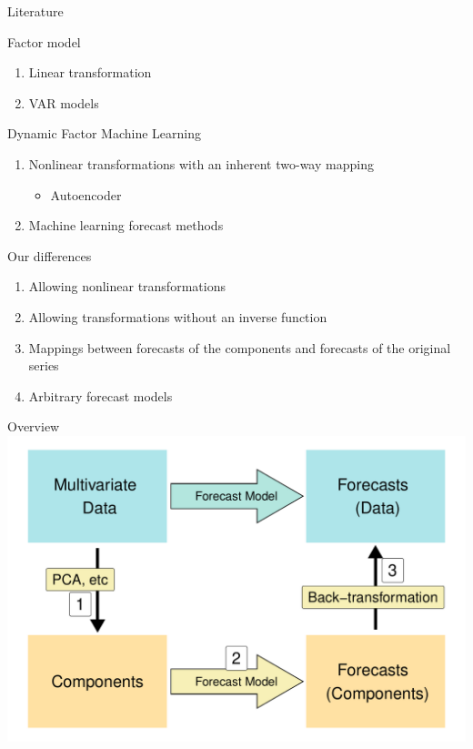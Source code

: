 \documentclass[14pt,ignorenonframetext,]{beamer}
\providecommand{\tightlist}{%
  \setlength{\itemsep}{0pt}\setlength{\parskip}{0pt}}
\begin{document}
\begin{frame}{Literature}
\protect\hypertarget{literature}{}
\begin{block}{Factor model \citep{Bai2008-of}}
\protect\hypertarget{factor-model-bai2008-of}{}
\begin{enumerate}
\tightlist
\item
  Linear transformation
\item
  VAR models
\end{enumerate}
\end{block}

\begin{block}{Dynamic Factor Machine Learning
\citep[DFML,][]{DeStefani2021-nt}}
\protect\hypertarget{dynamic-factor-machine-learning-dfml-destefani2021-nt}{}
\begin{enumerate}
\tightlist
\item
  Nonlinear transformations with an inherent two-way mapping

  \begin{itemize}
  \tightlist
  \item
    Autoencoder
  \end{itemize}
\item
  Machine learning forecast methods
\end{enumerate}
\end{block}
\end{frame}

\begin{frame}{Our differences}
\protect\hypertarget{our-differences}{}
\begin{enumerate}
\tightlist
\item
  Allowing nonlinear transformations
\item
  Allowing transformations without an inverse function
\item
  Mappings between forecasts of the components and forecasts of the
  original series
\item
  Arbitrary forecast models
\end{enumerate}
\end{frame}

\begin{frame}{Overview}
\protect\hypertarget{overview}{}
\includegraphics[width=\linewidth]{plot/p_ours}
\end{frame}
\end{document}
